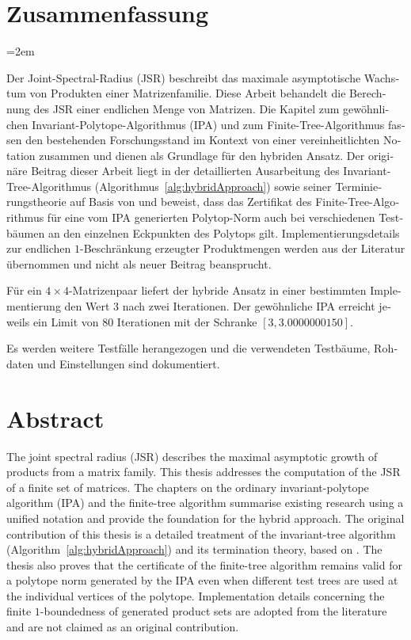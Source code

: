 \chapter*{Zusammenfassung}
\begin{otherlanguage}{ngerman}
    \emergencystretch=2em

    Der Joint-Spectral-Radius (JSR) beschreibt das maximale asymptotische Wachstum von Produkten einer Matrizenfamilie.
    Diese Arbeit behandelt die Berechnung des JSR einer endlichen Menge von Matrizen. Die Kapitel zum gewöhnlichen Invariant-Polytope-Algorithmus (IPA) und zum Finite-Tree-Algorithmus fassen den bestehenden Forschungsstand im Kontext von einer vereinheitlichten Notation zusammen und dienen als Grundlage für den hybriden Ansatz. Der originäre Beitrag dieser Arbeit liegt in der detaillierten Ausarbeitung des Invariant-Tree-Algorithmus (Algorithmus~\ref{alg:hybridApproach}) sowie seiner Terminierungstheorie auf Basis von \citep{MejstrikReif2025HybridApproachJSR} und beweist, dass das Zertifikat des Finite-Tree-Algorithmus für eine vom IPA generierten Polytop-Norm auch bei verschiedenen Testbäumen an den einzelnen Eckpunkten des Polytops gilt. Implementierungsdetails zur endlichen $1$-Beschränkung erzeugter Produktmengen werden aus der Literatur übernommen und nicht als neuer Beitrag beansprucht. 
     
    Für ein $4\times4$-Matrizenpaar liefert der hybride Ansatz in einer bestimmten Implementierung den Wert $3$ nach zwei Iterationen.
    Der gewöhnliche IPA erreicht jeweils ein Limit von $80$ Iterationen mit der Schranke $[3,3.0000000150]$.

    Es werden weitere Testfälle herangezogen und die verwendeten Testbäume, Rohdaten und Einstellungen sind dokumentiert.
\end{otherlanguage}

\chapter*{Abstract}

The joint spectral radius (JSR) describes the maximal asymptotic growth of products from a matrix family.
This thesis addresses the computation of the JSR of a finite set of matrices.
The chapters on the ordinary invariant-polytope algorithm (IPA) and the finite-tree algorithm summarise existing research using a unified notation and provide the foundation for the hybrid approach.
The original contribution of this thesis is a detailed treatment of the invariant-tree algorithm (Algorithm~\ref{alg:hybridApproach}) and its termination theory, based on \citep{MejstrikReif2025HybridApproachJSR}.
The thesis also proves that the certificate of the finite-tree algorithm remains valid for a polytope norm generated by the IPA even when different test trees are used at the individual vertices of the polytope.
Implementation details concerning the finite $1$-boundedness of generated product sets are adopted from the literature and are not claimed as an original contribution.

